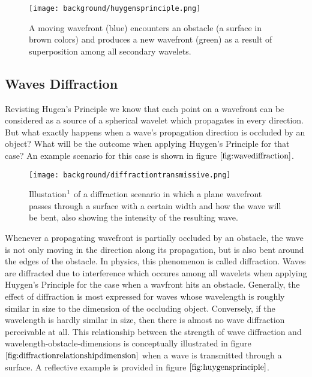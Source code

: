 \begin{figure}[H]
  \centering
  \texttt{[image: background/huygensprinciple.png]}
  \caption[Huygen's Principle]{A moving wavefront (blue) encounters an obstacle (a surface in brown colors) and produces a new wavefront (green) as a result of superposition among all secondary wavelets.}
  \label{fig:huygensprinciple}
\end{figure}

\subsection{Waves Diffraction}
Revisting Hugen's Principle we know that each point on a wavefront can be considered as a source of a spherical wavelet which propagates in every direction. But what exactly happens when a wave's propagation direction is occluded by an object? What will be the outcome when applying Huygen's Principle for that case? An example scenario for this case is shown in figure $\ref{fig:wavediffraction}$. 

\begin{figure}[H]
  \centering
  \texttt{[image: background/diffractiontransmissive.png]}
  \caption[Diffracted Wave]{Illustation$\footnotemark$ of a diffraction scenario in which a plane wavefront passes through a surface with a certain width and how the wave will be bent, also showing the intensity of the resulting wave.}
  \label{fig:wavediffraction}
\end{figure}

Whenever a propagating wavefront is partially occluded by an obstacle, the wave is not only moving in the direction along its propagation, but is also bent around the edges of the obstacle. In physics, this phenomenon is called diffraction. Waves are diffracted due to interference which occures among all wavelets when applying Huygen's Principle for the case when a wavfront hits an obstacle. Generally, the effect of diffraction is most expressed for waves whose wavelength is roughly similar in size to the dimension of the occluding object. Conversely, if the wavelength is hardly similar in size, then there is almost no wave diffraction perceivable at all. This relationship between the strength of wave diffraction and wavelength-obstacle-dimensions is conceptually illustrated in figure $\ref{fig:diffractionrelationshipdimension}$ when a wave is transmitted through a surface. A reflective example is provided in figure $\ref{fig:huygensprinciple}$.


